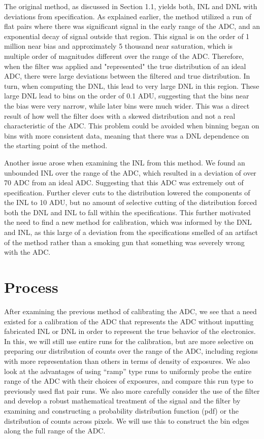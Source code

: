 \documentclass[11pt, letterpaper]{article}
\begin{document}
The original method, as discussed in Section 1.1, yields both, INL and DNL with deviations from specification. 
As explained earlier, the method utilized a run of flat pairs where there was significant signal in the early range of the ADC, and an exponential decay of signal outside that region. 
This signal is on the order of 1 million near bias and approximately 5 thousand near saturation, which is multiple order of magnitudes different over the range of the ADC. 
Therefore, when the filter was applied and "represented" the true distribution of an ideal ADC, there were large deviations between the filtered and true distribution. 
In turn, when computing the DNL, this lead to very large DNL in this region. 
These large DNL lead to bins on the order of 0.1 ADU, suggesting that the bins near the bias were very narrow, while later bins were much wider. 
This was a direct result of how well the filter does with a skewed distribution and not a real characteristic of the ADC. 
This problem could be avoided when binning began on bins with more consistent data, meaning that there was a DNL dependence on the starting point of the method. 
\indent 


Another issue arose when examining the INL from this method. 
We found an unbounded INL over the range of the ADC, which resulted in a deviation of over 70 ADC from an ideal ADC. 
Suggesting that this ADC was extremely out of specification. 
Further clever cuts to the distribution lowered the components of the INL to 10 ADU, but no amount of selective cutting of the distribution forced both the DNL and INL to fall within the specifications. 
This further motivated the need to find a new method for calibration, which was informed by the DNL and INL, as this large of a deviation from the specifications smelled of an artifact of the method rather than a smoking gun that something was severely wrong with the ADC. 

\section{Process}
\indent


After examining the previous method of calibrating the ADC, we see that a need existed for a calibration of the ADC that represents the ADC without inputting fabricated INL or DNL in order to represent the true behavior of the electronics. 
In this, we will still use entire runs for the calibration, but are more selective on preparing our distribution of counts over the range of the ADC, including regions with more representation than others in terms of density of exposures. 
We also look at the advantages of using “ramp” type runs to uniformly probe the entire range of the ADC with their choices of exposures, and compare this run type to previously used flat pair runs.
We also more carefully consider the use of the filter and develop a robust mathematical treatment of the signal and the filter by examining and constructing a probability distribution function (pdf) or the distribution of counts across pixels.  
We will use this to construct the bin edges along the full range of the ADC. 
\indent 
\end{document}
